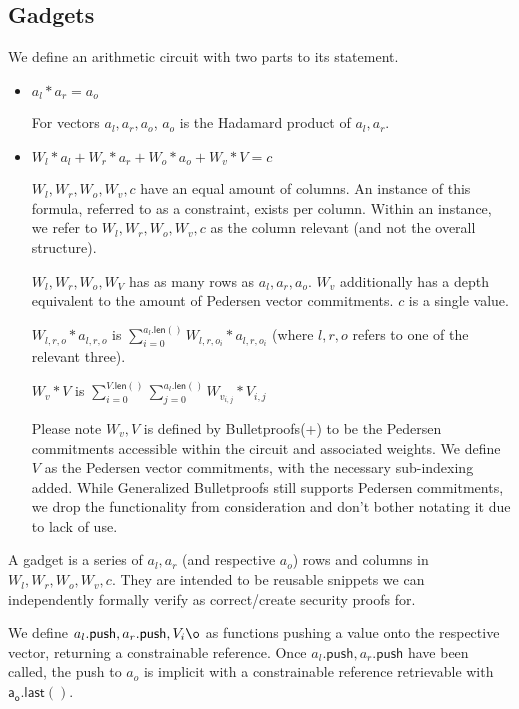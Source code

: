 \documentclass[]{article}
\begin{document}
\newpage

\subsection{Gadgets}

We define an arithmetic circuit with two parts to its statement.

\begin{itemize}
	\item
	$a_l * a_r = a_o$
	
	For vectors $a_l, a_r, a_o$, $a_o$ is the Hadamard product of $a_l, a_r$.
	\item
	$W_l * a_l + W_r * a_r + W_o * a_o + W_v * V = c$
	
	$W_l, W_r, W_o, W_v, c$ have an equal amount of columns. An instance of this formula, referred to as a constraint, exists per column. Within an instance, we refer to $W_l, W_r, W_o, W_v, c$ as the column relevant (and not the overall structure).
	
	$W_l, W_r, W_o, W_V$ has as many rows as $a_l, a_r, a_o$. $W_v$ additionally has a depth equivalent to the amount of Pedersen vector commitments. $c$ is a single value.
	
    $W_{l,r,o} * a_{l,r,o}$ is $\sum^{a_l\mathsf{.len}()}_{i=0} W_{l,r,o_i} * a_{l,r,o_i}$ (where $l,r,o$ refers to one of the relevant three).
	
	$W_v * V$ is $\sum^{V\mathsf{.len}()}_{i=0} \sum^{a_l\mathsf{.len}()}_{j=0} W_{v_{i, j}} * V_{i, j}$

	Please note $W_v, V$ is defined by Bulletproofs(+) to be the Pedersen commitments accessible within the circuit and associated weights. We define $V$ as the Pedersen vector commitments, with the necessary sub-indexing added. While Generalized Bulletproofs still supports Pedersen commitments, we drop the functionality from consideration and don't bother notating it due to lack of use.
\end{itemize}

A gadget is a series of $a_l, a_r$ (and respective $a_o$) rows and columns in $W_l, W_r, W_o, W_v, c$. They are intended to be reusable snippets we can independently formally verify as correct/create security proofs for.

\newcommand{\p}{\mathsf{.push}}
\newcommand{\al}{a_l\p}
\newcommand{\ar}{a_r\p}
\newcommand{\aol}{\mathsf{a_o.last()}}

We define $\al, \ar, V_i\o$ as functions pushing a value onto the respective vector, returning a constrainable reference. Once $\al, \ar$ have been called, the push to $a_o$ is implicit with a constrainable reference retrievable with $\aol$.
\end{document}

